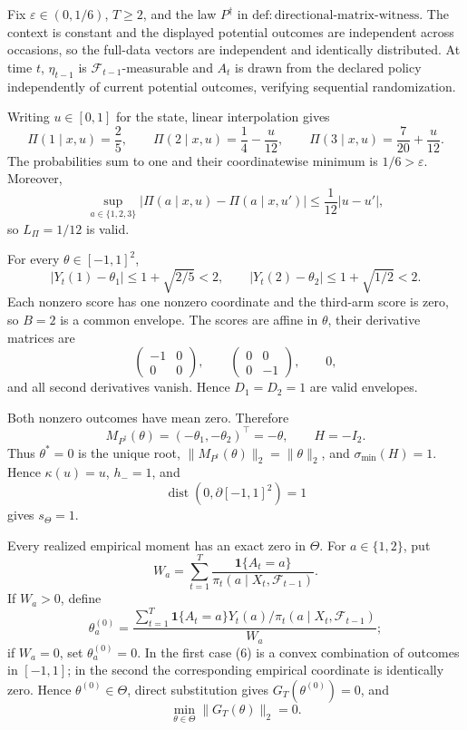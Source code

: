 Fix \(\varepsilon\in(0,1/6)\), \(T\ge2\), and the law \(P^\dagger\) in \(\mathrm{def:directional\text{-}matrix\text{-}witness}\).  The context is constant and the displayed potential outcomes are independent across occasions, so the full-data vectors are independent and identically distributed.  At time \(t\), \(\eta_{t-1}\) is \(\mathcal F_{t-1}\)-measurable and \(A_t\) is drawn from the declared policy independently of current potential outcomes, verifying sequential randomization.

Writing \(u\in[0,1]\) for the state, linear interpolation gives
\[
 \Pi(1\mid x,u)=\frac25,\qquad
 \Pi(2\mid x,u)=\frac14-\frac{u}{12},\qquad
 \Pi(3\mid x,u)=\frac7{20}+\frac{u}{12}.
\tag{1}
\]
The probabilities sum to one and their coordinatewise minimum is \(1/6>\varepsilon\).  Moreover,
\[
 \sup_{a\in\{1,2,3\}}|\Pi(a\mid x,u)-\Pi(a\mid x,u')|
 \le\frac1{12}|u-u'|,
\tag{2}
\]
so \(L_\Pi=1/12\) is valid.

For every \(\theta\in[-1,1]^2\),
\[
 |Y_t(1)-\theta_1|\le1+\sqrt{2/5}<2,
 \qquad |Y_t(2)-\theta_2|\le1+\sqrt{1/2}<2.
\tag{3}
\]
Each nonzero score has one nonzero coordinate and the third-arm score is zero, so \(B=2\) is a common envelope.  The scores are affine in \(\theta\), their derivative matrices are
\[
 \begin{pmatrix}-1&0\\0&0\end{pmatrix},\qquad
 \begin{pmatrix}0&0\\0&-1\end{pmatrix},\qquad 0,
\]
and all second derivatives vanish.  Hence \(D_1=D_2=1\) are valid envelopes.

Both nonzero outcomes have mean zero.  Therefore
\[
 M_{P^\dagger}(\theta)=(-\theta_1,-\theta_2)^\top=-\theta,
 \qquad H=-I_2.
\tag{4}
\]
Thus \(\theta^*=0\) is the unique root, \(\|M_{P^\dagger}(\theta)\|_2=\|\theta\|_2\), and \(\sigma_{\min}(H)=1\).  Hence \(\kappa(u)=u\), \(h_-=1\), and
\[
 \operatorname{dist}(0,\partial[-1,1]^2)=1
\tag{5}
\]
gives \(s_\Theta=1\).

Every realized empirical moment has an exact zero in \(\Theta\).  For \(a\in\{1,2\}\), put
\[
 W_a=\sum_{t=1}^T\frac{\mathbf1\{A_t=a\}}
 {\pi_t(a\mid X_t,\mathcal F_{t-1})}.
\]
If \(W_a>0\), define
\[
 \theta_a^{(0)}=
 \frac{\sum_{t=1}^T\mathbf1\{A_t=a\}Y_t(a)/
 \pi_t(a\mid X_t,\mathcal F_{t-1})}{W_a};
\tag{6}
\]
if \(W_a=0\), set \(\theta_a^{(0)}=0\).  In the first case (6) is a convex combination of outcomes in \([-1,1]\); in the second the corresponding empirical coordinate is identically zero.  Hence \(\theta^{(0)}\in\Theta\), direct substitution gives \(G_T(\theta^{(0)})=0\), and
\[
 \min_{\theta\in\Theta}\|G_T(\theta)\|_2=0.
\tag{7}
\]

